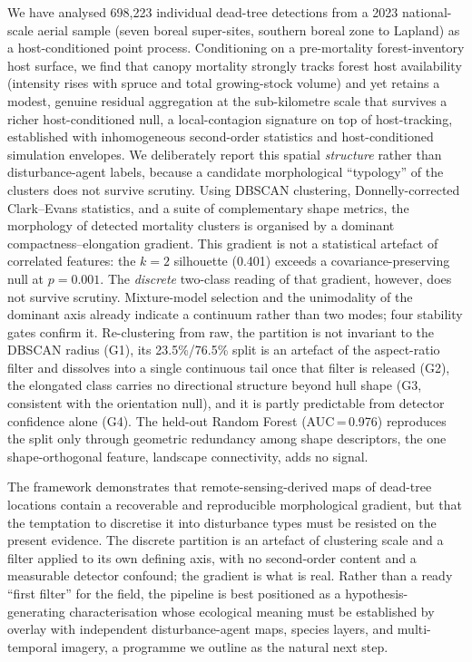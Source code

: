 \documentclass[twocolumn]{article}
\begin{document}
We have analysed 698,223 individual dead-tree detections from a 2023 national-scale aerial sample
(seven boreal super-sites, southern boreal zone to Lapland) as a host-conditioned point process.
Conditioning on a pre-mortality forest-inventory host surface, we find that canopy mortality
strongly tracks forest host availability (intensity rises with spruce and total growing-stock
volume) and yet retains a modest, genuine residual aggregation at the sub-kilometre scale that
survives a richer host-conditioned null, a local-contagion signature on top of host-tracking,
established with inhomogeneous second-order statistics and host-conditioned simulation envelopes.
We deliberately report this spatial \emph{structure} rather than disturbance-agent labels, because a
candidate morphological ``typology'' of the clusters does not survive scrutiny. Using DBSCAN
clustering, Donnelly-corrected Clark--Evans statistics, and a suite of complementary shape metrics,
the morphology of detected mortality clusters is organised by a dominant
compactness--elongation gradient. This gradient is not a statistical artefact of correlated
features: the $k=2$ silhouette (0.401) exceeds a covariance-preserving null at $p = 0.001$. The
\emph{discrete} two-class reading of that gradient, however, does not survive scrutiny. Mixture-model
selection and the unimodality of the dominant axis already indicate a continuum rather than two
modes; four stability gates confirm it. Re-clustering from raw, the partition is not invariant to
the DBSCAN radius (G1), its 23.5\%/76.5\% split is an artefact of the aspect-ratio filter and
dissolves into a single continuous tail once that filter is released (G2), the elongated class
carries no directional structure beyond hull shape (G3, consistent with the orientation null), and
it is partly predictable from detector confidence alone (G4). The held-out Random Forest
(AUC\,=\,0.976) reproduces the split only through geometric redundancy among shape descriptors, the
one shape-orthogonal feature, landscape connectivity, adds no signal.

The framework demonstrates that remote-sensing-derived maps of dead-tree locations contain a
recoverable and reproducible morphological gradient, but that the temptation to discretise it into
disturbance types must be resisted on the present evidence. The discrete partition is an artefact of
clustering scale and a filter applied to its own defining axis, with no second-order content and a
measurable detector confound; the gradient is what is real. Rather than a ready ``first filter'' for
the field, the pipeline is best positioned as a hypothesis-generating characterisation whose
ecological meaning must be established by overlay with independent disturbance-agent maps, species
layers, and multi-temporal imagery, a programme we outline as the natural next step.
\end{document}
